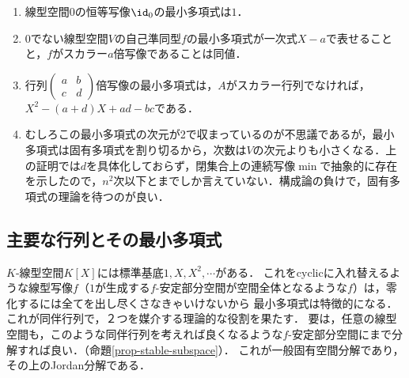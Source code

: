 \documentclass[uplatex, dvipdfmx]{jsreport}
\begin{document}
\begin{example}[最小多項式]\mbox{}
    \begin{enumerate}
        \item 線型空間$0$の恒等写像$\id_0$の最小多項式は$1$．
        \item $0$でない線型空間$V$の自己準同型$f$の最小多項式が一次式$X-a$で表せることと，$f$がスカラー$a$倍写像であることは同値．
        \item 行列$\begin{pmatrix}a&b\\c&d\end{pmatrix}$倍写像の最小多項式は，$A$がスカラー行列でなければ，$X^2-(a+d)X+ad-bc$である．
        \item むしろこの最小多項式の次元が2で収まっているのが不思議であるが，最小多項式は固有多項式を割り切るから，次数は$V$の次元よりも小さくなる．上の証明では$d$を具体化しておらず，閉集合上の連続写像$\min$で抽象的に存在を示したので，$n^2$次以下とまでしか言えていない．構成論の負けで，固有多項式の理論を待つのが良い．
    \end{enumerate}
\end{example}

\subsection{主要な行列とその最小多項式}

\begin{tcolorbox}[colframe=ForestGreen, colback=ForestGreen!10!white, breakable]
    $K$-線型空間$K[X]$には標準基底$1,X,X^2,\cdots$がある．
    これをcyclicに入れ替えるような線型写像$f$（$1$が生成する$f$-安定部分空間が空間全体となるような$f$）は，零化するには全てを出し尽くさなきゃいけないから
    最小多項式は特徴的になる．
    これが同伴行列で，２つを媒介する理論的な役割を果たす．
    要は，任意の線型空間も，このような同伴行列を考えれば良くなるような$f$-安定部分空間にまで分解すれば良い．（命題\ref{prop-stable-subspace}）．
    これが一般固有空間分解であり，その上のJordan分解である．
\end{tcolorbox}
\end{document}
